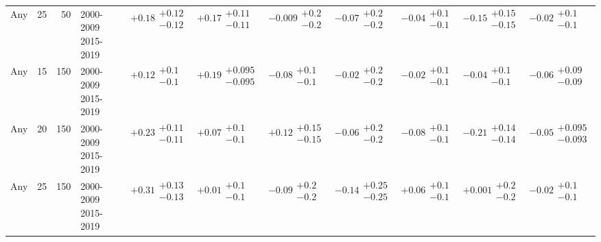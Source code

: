 \begin{table}[H]
\begin{tabular}{lrrllllllll}
Any & 25 & 50 & \makecell{2000-2009 \\ 2015-2019} & $\bm{+0.18}\substack{+0.12 \\ -0.12}$ & $\bm{+0.17}\substack{+0.11 \\ -0.11}$ & $-0.009\substack{+0.2 \\ -0.2}$ & $-0.07\substack{+0.2 \\ -0.2}$ & $-0.04\substack{+0.1 \\ -0.1}$ & $\bm{-0.15}\substack{+0.15 \\ -0.15}$ & $-0.02\substack{+0.1 \\ -0.1}$ \\
Any & 15 & 150 & \makecell{2000-2009 \\ 2015-2019} & $\bm{+0.12}\substack{+0.1 \\ -0.1}$ & $\bm{+0.19}\substack{+0.095 \\ -0.095}$ & $-0.08\substack{+0.1 \\ -0.1}$ & $-0.02\substack{+0.2 \\ -0.2}$ & $-0.02\substack{+0.1 \\ -0.1}$ & $-0.04\substack{+0.1 \\ -0.1}$ & $-0.06\substack{+0.09 \\ -0.09}$ \\
Any & 20 & 150 & \makecell{2000-2009 \\ 2015-2019} & $\bm{+0.23}\substack{+0.11 \\ -0.11}$ & $+0.07\substack{+0.1 \\ -0.1}$ & $+0.12\substack{+0.15 \\ -0.15}$ & $-0.06\substack{+0.2 \\ -0.2}$ & $-0.08\substack{+0.1 \\ -0.1}$ & $\bm{-0.21}\substack{+0.14 \\ -0.14}$ & $-0.05\substack{+0.095 \\ -0.093}$ \\
Any & 25 & 150 & \makecell{2000-2009 \\ 2015-2019} & $\bm{+0.31}\substack{+0.13 \\ -0.13}$ & $+0.01\substack{+0.1 \\ -0.1}$ & $-0.09\substack{+0.2 \\ -0.2}$ & $-0.14\substack{+0.25 \\ -0.25}$ & $+0.06\substack{+0.1 \\ -0.1}$ & $+0.001\substack{+0.2 \\ -0.2}$ & $-0.02\substack{+0.1 \\ -0.1}$ \\
\bottomrule
\end{tabular}\normalsize\renewcommand{\arraystretch}{1}
\end{table}


